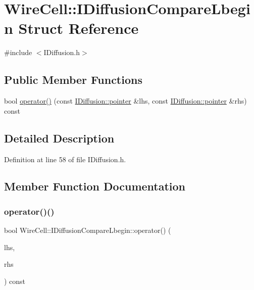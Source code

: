 \hypertarget{struct_wire_cell_1_1_i_diffusion_compare_lbegin}{}\section{Wire\+Cell\+:\+:I\+Diffusion\+Compare\+Lbegin Struct Reference}
\label{struct_wire_cell_1_1_i_diffusion_compare_lbegin}


{\ttfamily \#include $<$I\+Diffusion.\+h$>$}

\subsection*{Public Member Functions}
\begin{DoxyCompactItemize}
\item 
bool \hyperlink{struct_wire_cell_1_1_i_diffusion_compare_lbegin_aa637bf33fc8dd6a5e26c804df39f5e03}{operator()} (const \hyperlink{class_wire_cell_1_1_i_data_aff870b3ae8333cf9265941eef62498bc}{I\+Diffusion\+::pointer} \&lhs, const \hyperlink{class_wire_cell_1_1_i_data_aff870b3ae8333cf9265941eef62498bc}{I\+Diffusion\+::pointer} \&rhs) const
\end{DoxyCompactItemize}


\subsection{Detailed Description}


Definition at line 58 of file I\+Diffusion.\+h.



\subsection{Member Function Documentation}
\mbox{\label{struct_wire_cell_1_1_i_diffusion_compare_lbegin_aa637bf33fc8dd6a5e26c804df39f5e03}} 
\subsubsection{\texorpdfstring{operator()()}{operator()()}}
{\footnotesize\ttfamily bool Wire\+Cell\+::\+I\+Diffusion\+Compare\+Lbegin\+::operator() (\begin{DoxyParamCaption}\item[{const \hyperlink{class_wire_cell_1_1_i_data_aff870b3ae8333cf9265941eef62498bc}{I\+Diffusion\+::pointer} \&}]{lhs,  }\item[{const \hyperlink{class_wire_cell_1_1_i_data_aff870b3ae8333cf9265941eef62498bc}{I\+Diffusion\+::pointer} \&}]{rhs }\end{DoxyParamCaption}) const\hspace{0.3cm}{\ttfamily [inline]}}



